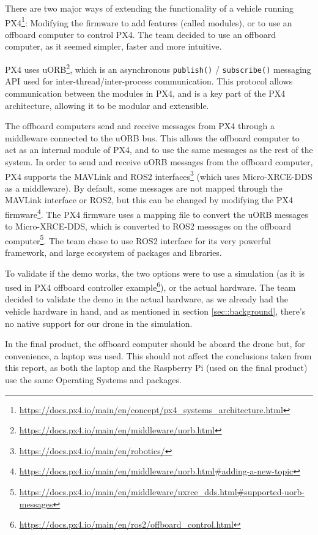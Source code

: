 \documentclass[a4paper]{article}
\begin{document}
There are two major ways of extending the functionality of a vehicle running PX4\footnote{\url{https://docs.px4.io/main/en/concept/px4_systems_architecture.html}}: Modifying the firmware to add features (called modules), or to use an offboard computer to control PX4. 
The team decided to use an offboard computer, as it seemed simpler, faster and more intuitive. 

PX4 uses uORB\footnote{\url{https://docs.px4.io/main/en/middleware/uorb.html}}, which is an asynchronous \verb|publish()| / \verb|subscribe()| messaging API used for inter-thread/inter-process communication. 
This protocol allows communication between the modules in PX4, and is a key part of the PX4 architecture, allowing it to be modular and extensible. 

The offboard computers send and receive messages from PX4 through a middleware connected to the uORB bus. 
This allows the offboard computer to act as an internal module of PX4, and to use the same messages as the rest of the system. 
In order to send and receive uORB messages from the offboard computer, PX4 supports the MAVLink and ROS2 interfaces\footnote{\url{https://docs.px4.io/main/en/robotics/}} (which uses Micro-XRCE-DDS as a middleware). 
By default, some messages are not mapped through the MAVLink interface or ROS2, but this can be changed by modifying the PX4 firmware\footnote{\url{https://docs.px4.io/main/en/middleware/uorb.html\#adding-a-new-topic}}. 
The PX4 firmware uses a mapping file to convert the uORB messages to Micro-XRCE-DDS, which is converted to ROS2 messages on the offboard computer\footnote{\url{https://docs.px4.io/main/en/middleware/uxrce_dds.html\#supported-uorb-messages}}. 
The team chose to use ROS2 interface for its very powerful framework, and large ecosystem of packages and libraries. 

To validate if the demo works, the two options were to use a simulation (as it is used in PX4 offboard controller example\footnote{\url{https://docs.px4.io/main/en/ros2/offboard_control.html}}), or the actual hardware. 
The team decided to validate the demo in the actual hardware, as we already had the vehicle hardware in hand, and as mentioned in section \ref{sec::background}, there's no native support for our drone in the simulation. 

In the final product, the offboard computer should be aboard the drone but, for convenience, a laptop was used. 
This should not affect the conclusions taken from this report, as both the laptop and the Raspberry Pi (used on the final product) use the same Operating Systems and packages. \\
\end{document}
